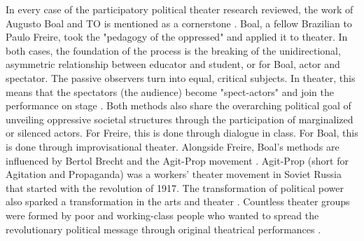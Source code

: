 \documentclass[dissertation,math,vertlayout,pdfa,colorlinks,nologo]{aaltoseries}
\begin{document}
In every case of the participatory political theater research reviewed, the work of Augusto Boal and TO \cite{boalTheatreOppressed2008} is mentioned as a cornerstone \cite{pierseCreativelyConnectingCivil2020,epskampTheatreDevelopmentIntroduction2006, tselikaConflictTransformationArt2019, matarassoRestlessArt2019}. Boal, a fellow Brazilian to Paulo Freire, took the "pedagogy of the oppressed" and applied it to theater. In both cases, the foundation of the process is the breaking of the unidirectional, asymmetric relationship between educator and student, or for Boal, actor and spectator. The passive observers turn into equal, critical subjects.  In theater, this means that the spectators (the audience) become "spect-actors" and join the performance on stage \cite{boalTheatreOppressed2008}. Both methods also share the overarching political goal of unveiling oppressive societal structures through the participation of marginalized or silenced actors. For Freire, this is done through dialogue in class. For Boal, this is done through improvisational theater. Alongside Freire, Boal's methods are influenced by Bertol Brecht and the Agit-Prop movement \cite[p.91]{friedmanPerformanceActivismPrecursors2021}. Agit-Prop (short for Agitation
and Propaganda) was a workers' theater movement in Soviet Russia that started with the revolution of 1917. The transformation of political power also sparked a transformation in the arts and theater \cite[p.97]{fischer-lichteTheatreSacrificeRitual2007}. Countless theater groups were formed by poor and working-class people who wanted to spread the revolutionary political message through original theatrical performances \cite[p. 17]{friedmanPerformanceActivismPrecursors2021}.
\end{document}
